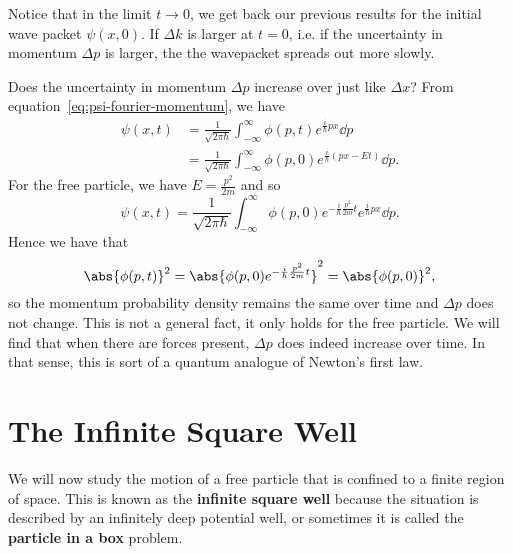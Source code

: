 \documentclass[../quantum_mechanics.tex]{subfiles}
\begin{document}
            Notice that in the limit $t\to 0$, we get back our previous results for the initial wave packet $\psi(x,0)$.
            If $\Delta k$ is larger at $t=0$, i.e. if the uncertainty in momentum $\Delta p$ is larger, the the wavepacket spreads out more slowly.

            Does the uncertainty in momentum $\Delta p$ increase over just like $\Delta x$?
            From equation~\ref{eq:psi-fourier-momentum}, we have
            \begin{align}
                \psi(x,t)&=\frac{1}{\sqrt{2\pi\hbar}}\int_{-\infty}^\infty\phi(p,t)e^{\frac{i}{\hbar}px}\dd{p}\\
                &=\frac{1}{\sqrt{2\pi\hbar}}\int_{-\infty}^\infty\phi(p,0)e^{\frac{i}{\hbar}(px-Et)}\dd{p}.
            \end{align}
            For the free particle, we have $E=\frac{p^2}{2m}$ and so
            \begin{equation}
                \psi(x,t)=\frac{1}{\sqrt{2\pi\hbar}}\int_{-\infty}^\infty\phi(p,0)e^{-\frac{i}{\hbar}\frac{p^2}{2m}t}e^{\frac{i}{\hbar}px}\dd{p}.
            \end{equation}
            Hence we have that
            \begin{equation}
                \abs{\phi(p,t)}^2=\abs{\phi(p,0)e^{-\frac{i}{\hbar}\frac{p^2}{2m}t}}^2=\abs{\phi(p,0)}^2,
            \end{equation}
            so the momentum probability density remains the same over time and $\Delta p$ does not change.
            This is not a general fact, it only holds for the free particle.
            We will find that when there are forces present, $\Delta p$ does indeed increase over time.
            In that sense, this is sort of a quantum analogue of Newton's first law.


    \section{The Infinite Square Well}\label{sec:infinite-square-well}
        We will now study the motion of a free particle that is confined to a finite region of space.
        This is known as the \textbf{infinite square well} because the situation is described by an infinitely deep potential well, or sometimes it is called the \textbf{particle in a box} problem.
\end{document}
